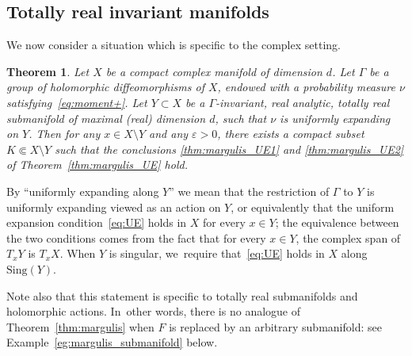 \documentclass[11pt]{article}
\let\e\varepsilon
\newcommand{\Sing}{{\mathrm{Sing}}}
\theoremstyle{plain}
\newtheorem{thm}{Theorem}[section]
\theoremstyle{definition}
\numberwithin{equation}{section}
\begin{document}
\subsection{Totally real invariant manifolds}
We now consider a situation which is specific to the complex setting.

\begin{thm}\label{thm:margulis_totalement_reel}
Let $X$ be a compact complex manifold of dimension $d$. Let $\Gamma$ be a group of holomorphic diffeomorphisms of $X$,
endowed with a probability measure $\nu$ satisfying~\eqref{eq:moment+}. Let $Y\subset X$
be a $\Gamma$-invariant,
real analytic, totally real submanifold of maximal (real) dimension $d$, such that
$\nu$ is uniformly expanding on $Y$.
Then for any
$x\in X\setminus Y$ and any $\e>0$, there exists a compact subset $K\Subset X\setminus Y$ such that the
conclusions \eqref{thm:margulis_UE1} and \eqref{thm:margulis_UE2} of Theorem~\ref{thm:margulis_UE} hold.
\end{thm}

By ``uniformly expanding along $Y$'' we mean that the restriction of $\Gamma$ to $Y$ is
uniformly expanding viewed as an action on $Y$, or equivalently
that the uniform expansion condition~\eqref{eq:UE} holds in $X$ for every $x\in Y$; the equivalence between the two conditions comes from the fact that for every $x\in Y$, the
complex span of $T_xY$ is $T_xX$. When $Y$ is singular, we~require that~\eqref{eq:UE} holds in $X$ along
$\Sing(Y)$.

Note also that this statement is specific to totally real submanifolds and holomorphic actions. In~other words,
there is no analogue of Theorem~\ref{thm:margulis} when $F$ is replaced by an arbitrary submanifold:
see Example~\ref{eg:margulis_submanifold} below.
\end{document}
